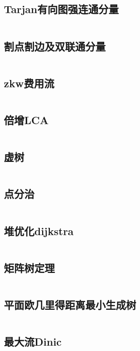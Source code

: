 \documentclass[UTF8]{ctexart}
\begin{document}
\subsection{Tarjan有向图强连通分量}
\inputminted{cpp}{graphtheory/Tarjan有向图强连通分量.cpp}

\subsection{割点割边及双联通分量}
\inputminted{cpp}{graphtheory/割点割边及双联通分量.cpp}

\subsection{zkw费用流}
\inputminted{cpp}{graphtheory/zkw费用流.cpp}

\subsection{倍增LCA}
\inputminted{cpp}{graphtheory/倍增LCA.cpp}

\subsection{虚树}
\inputminted{cpp}{graphtheory/VirtualTree.cpp}

\subsection{点分治}
\inputminted{cpp}{graphtheory/点分治.cpp}

\subsection{堆优化dijkstra}
\inputminted{cpp}{graphtheory/堆优化dijkstra.cpp}

\subsection{矩阵树定理}
\inputminted{cpp}{graphtheory/矩阵树定理.cpp}

\subsection{平面欧几里得距离最小生成树}
\inputminted{cpp}{graphtheory/平面欧几里得距离最小生成树.cpp}

\subsection{最大流Dinic}
\inputminted{cpp}{graphtheory/最大流Dinic.cpp}
\end{document}
